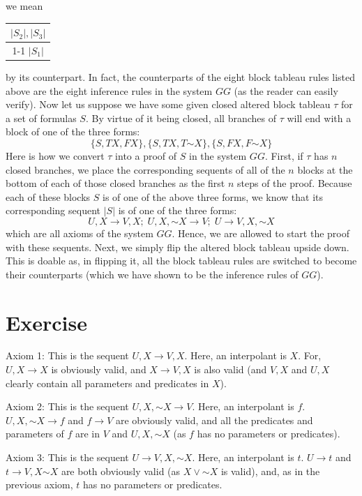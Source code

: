 \documentclass{article}
\newcommand*{\oldneg}{\mathord{\sim}}
\theoremstyle{definition}
\begin{document}
we mean
\begin{center}
\begin{tabular}{c}
	$|S_2|,|S_3|$ \\
	\cline{1-1}
	$|S_1|$
\end{tabular}
\end{center}
by its counterpart. In fact, the counterparts of the eight block tableau rules listed above are the eight inference rules in the system $GG$ (as the reader can 
easily verify). Now let us suppose we have some given closed altered block tableau $\tau$ for a set of formulas $S$. By virtue of it being closed, all branches of 
$\tau$ will end with a block of one of the three forms:
\[ \{S,TX,FX\},\{S,TX,T\oldneg X\},\{S,FX,F\oldneg X\} \] 
Here is how we convert $\tau$ into a proof of $S$ in the system $GG$. First, if $\tau$ has $n$ closed branches, we place the corresponding sequents of 
all of the $n$ blocks at the bottom 
of each of those closed branches as the first $n$ steps of the proof. Because each of these blocks $S$ is of one of the above three forms, we know that its corresponding 
sequent $|S|$ is of one of the three forms:
\[ U,X\rightarrow V,X;\; U,X,\oldneg X\rightarrow V;\; U\rightarrow V,X,\oldneg X \] which are all axioms of the system $GG$. Hence, we are allowed to start the 
proof with these sequents. Next, we simply flip the altered block tableau upside down. This is doable as, in flipping it, all the block tableau rules are switched 
to become their counterparts (which we have shown to be the inference rules of $GG$). 

\section*{Exercise}
Axiom 1: This is the sequent $U,X\rightarrow V,X$. Here, an interpolant is $X$. For, $U,X\rightarrow X$ is obviously valid, and 
$X\rightarrow V,X$ is also valid (and $V,X$ and $U,X$ clearly contain all parameters and predicates in $X$).


Axiom 2: This is the sequent $U,X,\oldneg X\rightarrow V$. Here, an interpolant is $f$. 
$U,X,\oldneg X\rightarrow f$ and $f\rightarrow V$ are obviously valid, and all the predicates and parameters of $f$ are in $V$ and 
$U,X,\oldneg X$ (as $f$ has no parameters or predicates). 


Axiom 3: This is the sequent $U\rightarrow V,X,\oldneg X$. Here, an interpolant is $t$.
$U\rightarrow t$ and $t\rightarrow V,X\oldneg X$ are both obviously valid (as $X\vee\oldneg X$ is valid), and, as in the previous axiom, 
$t$ has no parameters or predicates.
\end{document}
